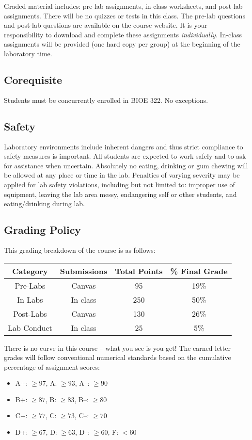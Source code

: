 \documentclass{article}
\begin{document}
Graded material includes: pre-lab assignments, in-class worksheets, and post-lab assignments.  There will be no quizzes or tests in this class. The pre-lab questions and post-lab questions are available on the course website. It is your responsibility to download and complete these assignments \textit{individually}. In-class assignments will be provided (one hard copy per group) at the beginning of the laboratory time.


\subsection*{Corequisite}
Students must be concurrently enrolled in BIOE 322. No exceptions.

\subsection*{Safety}
Laboratory environments include inherent dangers and thus strict compliance to safety measures is important. All students are expected to work safely and to ask for assistance when uncertain. Absolutely no eating, drinking or gum chewing will be allowed at any place or time in the lab. Penalties of varying severity may be applied for lab safety violations, including but not limited to: improper use of equipment, leaving the lab area messy, endangering self or other students, and eating/drinking during lab.

\subsection*{Grading Policy}

This grading breakdown of the course is as follows:
\begin{table}[h!]
	\centering
\begin{tabular}[h!]{cccc}
\toprule
	Category & Submissions & Total Points & \% Final Grade\\
	\midrule
	Pre-Labs & Canvas & 95 & 19\%\\
	In-Labs & In class & 250 & 50\%\\
	Post-Labs & Canvas & 130 & 26\%\\
	Lab Conduct & In class & 25 & 5\%\\
	\bottomrule
\end{tabular}
\end{table}

There is no curve in this course -- what you see is you get! The earned letter grades will follow conventional numerical standards based on the cumulative percentage of assignment scores:
\begin{itemize}
	\item A+: $\geq 97$, A: $\geq 93$, A--: $\geq 90$
	\item B+: $\geq 87$, B: $\geq 83$, B--: $\geq 80$
	\item C+: $\geq 77$, C: $\geq 73$, C--: $\geq 70$
	\item D+: $\geq 67$, D: $\geq 63$, D--: $\geq 60$, F: $< 60$
\end{itemize}
\end{document}
